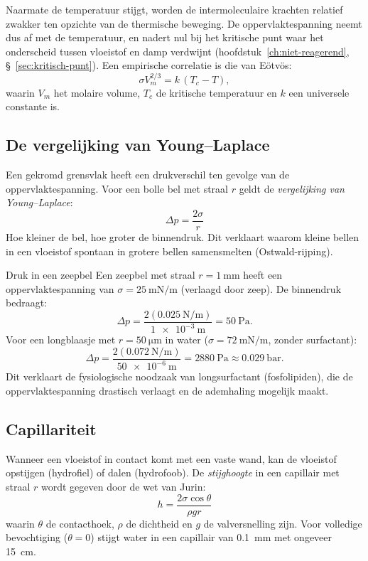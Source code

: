 Naarmate de temperatuur stijgt, worden de intermoleculaire krachten relatief zwakker ten opzichte van de thermische beweging. De oppervlaktespanning neemt dus af met de temperatuur, en nadert nul bij het kritische punt waar het onderscheid tussen vloeistof en damp verdwijnt (hoofdstuk~\ref{ch:niet-reagerend}, \S~\ref{sec:kritisch-punt}). Een empirische correlatie is die van E\"otv\"os:
\begin{equation}
\sigma V_m^{2/3} = k\,(T_c - T),
\end{equation}
waarin $V_m$ het molaire volume, $T_c$ de kritische temperatuur en $k$ een universele constante is.

\subsection{De vergelijking van Young--Laplace}

Een gekromd grensvlak heeft een drukverschil ten gevolge van de oppervlaktespanning. Voor een bolle bel met straal $r$ geldt de \emph{vergelijking van Young--Laplace}:
\begin{equation}
\boxed{\;\Delta p = \frac{2\sigma}{r}\;}
\label{eq:young-laplace}
\end{equation}
Hoe kleiner de bel, hoe groter de binnendruk. Dit verklaart waarom kleine bellen in een vloeistof spontaan in grotere bellen samensmelten (Ostwald-rijping).

\begin{voorbeeld}{Druk in een zeepbel}
Een zeepbel met straal $r = \SI{1}{\milli\metre}$ heeft een oppervlaktespanning van $\sigma = \SI{25}{\milli\newton\per\metre}$ (verlaagd door zeep). De binnendruk bedraagt:
\[
\Delta p = \frac{2(\SI{0.025}{\newton\per\metre})}{\SI{1e-3}{\metre}} = \SI{50}{\pascal}.
\]
Voor een longblaasje met $r = \SI{50}{\micro\metre}$ in water ($\sigma = \SI{72}{\milli\newton\per\metre}$, zonder surfactant):
\[
\Delta p = \frac{2(\SI{0.072}{\newton\per\metre})}{\SI{50e-6}{\metre}} = \SI{2880}{\pascal} \approx \SI{0.029}{\bar}.
\]
Dit verklaart de fysiologische noodzaak van longsurfactant (fosfolipiden), die de oppervlaktespanning drastisch verlaagt en de ademhaling mogelijk maakt.
\end{voorbeeld}

\subsection{Capillariteit}

Wanneer een vloeistof in contact komt met een vaste wand, kan de vloeistof opstijgen (hydrofiel) of dalen (hydrofoob). De \emph{stijghoogte} in een capillair met straal $r$ wordt gegeven door de wet van Jurin:
\begin{equation}
\boxed{\;h = \frac{2\sigma \cos\theta}{\rho g r}\;}
\label{eq:jurin}
\end{equation}
waarin $\theta$ de contacthoek, $\rho$ de dichtheid en $g$ de valversnelling zijn. Voor volledige bevochtiging ($\theta = 0$) stijgt water in een capillair van \SI{0.1}{\milli\metre} met ongeveer \SI{15}{\centi\metre}.

